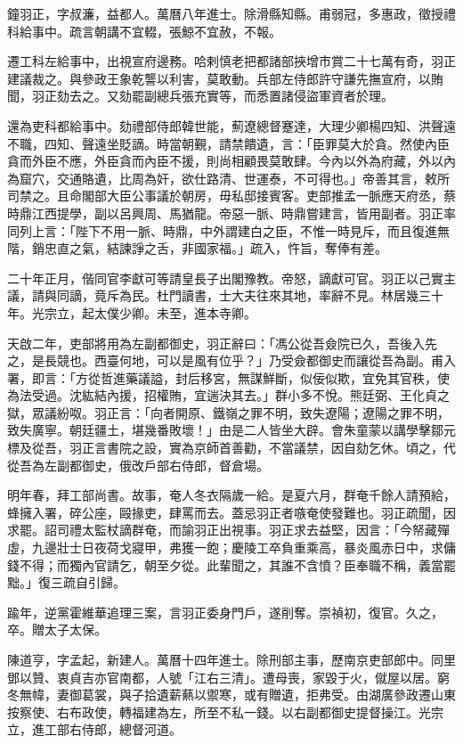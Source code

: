 \begin{pinyinscope}
鐘羽正，字叔濂，益都人。萬曆八年進士。除滑縣知縣。甫弱冠，多惠政，徵授禮科給事中。疏言朝講不宜輟，張鯨不宜赦，不報。

遷工科左給事中，出視宣府邊務。哈剌慎老把都諸部挾增市賞二十七萬有奇，羽正建議裁之。與參政王象乾讋以利害，莫敢動。兵部左侍郎許守謙先撫宣府，以賄聞，羽正劾去之。又劾罷副總兵張充實等，而悉置諸侵盜軍資者於理。

還為吏科都給事中。劾禮部侍郎韓世能，薊遼總督蹇達，大理少卿楊四知、洪聲遠不職，四知、聲遠坐貶謫。時當朝覲，請禁饋遺，言：「臣罪莫大於貪。然使內臣貪而外臣不應，外臣貪而內臣不援，則尚相顧畏莫敢肆。今內以外為府藏，外以內為窟穴，交通賂遺，比周為奸，欲仕路清、世運泰，不可得也。」帝善其言，敕所司禁之。且命閣部大臣公事議於朝房，毋私邸接賓客。吏部推孟一脈應天府丞，蔡時鼎江西提學，副以呂興周、馬猶龍。帝惡一脈、時鼎嘗建言，皆用副者。羽正率同列上言：「陛下不用一脈、時鼎，中外謂建白之臣，不惟一時見斥，而且復進無階，銷忠直之氣，結諫諍之舌，非國家福。」疏入，忤旨，奪俸有差。

二十年正月，偕同官李獻可等請皇長子出閣豫教。帝怒，謫獻可官。羽正以己實主議，請與同謫，竟斥為民。杜門讀書，士大夫往來其地，率辭不見。林居幾三十年。光宗立，起太僕少卿。未至，進本寺卿。

天啟二年，吏部將用為左副都御史，羽正辭曰：「馮公從吾僉院已久，吾後入先之，是長競也。西臺何地，可以是風有位乎？」乃受僉都御史而讓從吾為副。甫入署，即言：「方從哲進藥議謚，封后移宮，無謀鮮斷，似佞似欺，宜免其官秩，使為法受過。沈紘結內援，招權賄，宜遄決其去。」群小多不悅。熊廷弼、王化貞之獄，眾議紛呶。羽正言：「向者開原、鐵嶺之罪不明，致失遼陽；遼陽之罪不明，致失廣寧。朝廷疆土，堪幾番敗壞！」由是二人皆坐大辟。會朱童蒙以講學擊鄒元標及從吾，羽正言書院之設，實為京師首善勸，不當議禁，因自劾乞休。頃之，代從吾為左副都御史，俄改戶部右侍郎，督倉場。

明年春，拜工部尚書。故事，奄人冬衣隔歲一給。是夏六月，群奄千餘人請預給，蜂擁入署，碎公座，毆掾吏，肆罵而去。蓋忌羽正者嗾奄使發難也。羽正疏聞，因求罷。詔司禮太監杖謫群奄，而諭羽正出視事。羽正求去益堅，因言：「今帑藏殫虛，九邊壯士日夜荷戈寢甲，弗獲一飽；慶陵工卒負重乘高，暴炎風赤日中，求傭錢不得；而獨內官請乞，朝至夕從。此輩聞之，其誰不含憤？臣奉職不稱，義當罷黜。」復三疏自引歸。

踰年，逆黨霍維華追理三案，言羽正委身門戶，遂削奪。崇禎初，復官。久之，卒。贈太子太保。

陳道亨，字孟起，新建人。萬曆十四年進士。除刑部主事，歷南京吏部郎中。同里鄧以贊、衷貞吉亦官南都，人號「江右三清」。遭母喪，家毀于火，僦屋以居。窮冬無幃，妻御葛裳，與子拾遺薪爇以禦寒，或有贈遺，拒弗受。由湖廣參政遷山東按察使、右布政使，轉福建為左，所至不私一錢。以右副都御史提督操江。光宗立，進工部右侍郎，總督河道。


\end{pinyinscope}
